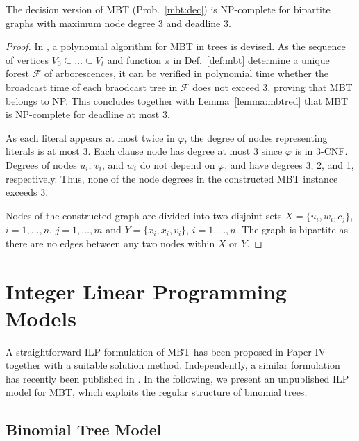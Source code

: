 \begin{proposition}
	The decision version of MBT (Prob.~\ref{mbt:dec}) is NP-complete for bipartite graphs with maximum node degree 3 and deadline 3.
\end{proposition}
\begin{proof}
In \cite{slater81}, a polynomial algorithm for MBT in trees is devised.
As the sequence of vertices $V_0\subseteq\dots\subseteq V_t$ and function $\pi$ in Def.~\ref{def:mbt} determine a unique forest $\mathcal{F}$ of arborescences,
it can be verified in polynomial time whether the broadcast time of each braodcast tree in $\mathcal{F}$ does not exceed 3, proving that MBT belongs to NP.
This concludes together with Lemma~\ref{lemma:mbtred} that MBT is NP-complete for deadline at most 3.

As each literal appears at most twice in $\varphi$, the degree of nodes representing literals is at most 3. 
Each clause node has degree at most 3 since $\varphi$ is in 3-CNF.
Degrees of nodes $u_i$, $v_i$, and $w_i$ do not depend on $\varphi$, and have degrees 3, 2, and 1, respectively.
Thus, none of the node degrees in the constructed MBT instance exceeds 3.

Nodes of the constructed graph are divided into two disjoint sets $X=\{u_i,w_i,c_j\}$, $i=1,\dots,n$, $j=1,\dots,m$ and $Y=\{x_i,\bar{x}_i,v_i\}$, $i=1,\dots,n$.
The graph is bipartite as there are no edges between any two nodes within $X$ or $Y$.
\end{proof}

\section{Integer Linear Programming Models}

A straightforward ILP formulation of MBT has been proposed in Paper IV together with a suitable solution method.
Independently, a similar formulation has recently been published in \cite{desousa18}.
In the following, we present an unpublished ILP model for MBT, which exploits the regular structure of binomial trees.

\subsection{Binomial Tree Model}

